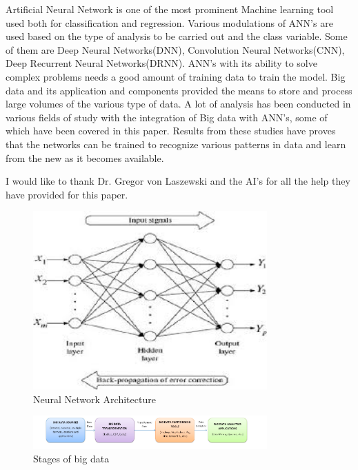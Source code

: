\documentclass[sigconf]{acmart}
\begin{document}
Artificial Neural Network is one of the most prominent Machine learning tool used both for classification and regression. Various modulations of ANN's are used based on the type of analysis to be carried out and the class variable. Some of them are Deep Neural Networks(DNN), Convolution Neural Networks(CNN), Deep Recurrent Neural Networks(DRNN). ANN's with its ability to solve complex problems needs a good amount of training data to train the model. Big data and its application and components provided the means to store and process large volumes of the various type of data. A lot of analysis has been conducted in various fields of study with the integration of Big data with ANN's, some of which have been covered in this paper. Results from these studies have proves that the networks can be trained to recognize various patterns in data and learn from the new as it becomes available.







\begin{acks}

I would like to thank Dr. Gregor von Laszewski and the AI's for all the help they have provided for this paper.
\end{acks}




 

\begin{figure}[htp]
    \includegraphics[width=0.8\textwidth]{images/images.jpg}
    \caption{Neural Network Architecture \cite{google}}
    \label{fig:figure1}
\end{figure}

\begin{figure}[htp]
    \includegraphics[width=0.8\textwidth]{images/images1.jpg}
    \caption{Stages of big data}
    \label{fig:figure2}
\end{figure}
\end{document}
